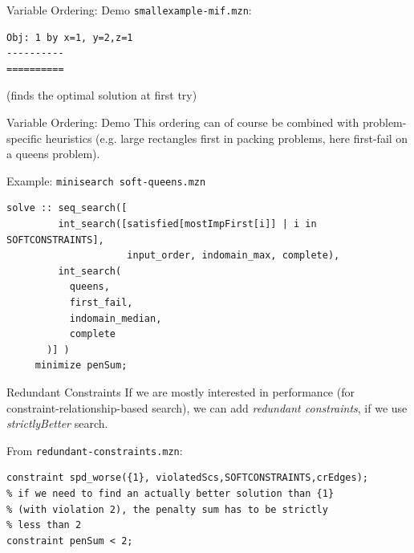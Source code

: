 \documentclass[10pt,xcolor={dvipsnames},fleqn]{beamer}
\begin{document}
\begin{frame}[fragile]{Variable Ordering: Demo}
\texttt{smallexample-mif.mzn}:


\small 
\begin{verbatim}
Obj: 1 by x=1, y=2,z=1
----------
==========
\end{verbatim}
(finds the optimal solution at first try)
\end{frame}

\begin{frame}[fragile]{Variable Ordering: Demo}
This ordering can of course be combined with problem-specific heuristics 
(e.g. large rectangles first in packing problems, here first-fail on a queens problem).

\vspace*{2ex}
Example: \texttt{minisearch soft-queens.mzn}
\begin{lstlisting}
solve :: seq_search([
         int_search([satisfied[mostImpFirst[i]] | i in SOFTCONSTRAINTS], 
                     input_order, indomain_max, complete),
         int_search(
           queens, 
           first_fail,
           indomain_median,
           complete
       )] ) 
     minimize penSum;
\end{lstlisting}
\end{frame}



\begin{frame}[fragile]{Redundant Constraints}
If we are mostly interested in performance (for constraint-relationship-based search), 
we can add \emph{redundant constraints}, if we use \emph{strictlyBetter} search.

\vspace*{2ex}

From \texttt{redundant-constraints.mzn}:
\begin{lstlisting}
constraint spd_worse({1}, violatedScs,SOFTCONSTRAINTS,crEdges);
% if we need to find an actually better solution than {1}
% (with violation 2), the penalty sum has to be strictly
% less than 2
constraint penSum < 2;
\end{lstlisting}
\end{frame}
\end{document}
